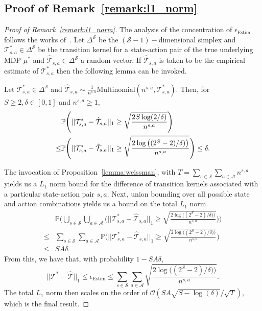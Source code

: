 \subsection{Proof of Remark~\ref{remark:l1_norm}}\label{sec:proof_remark}
\begin{proof}[Proof of Remark~\ref{remark:l1_norm}]
    The analysis of the concentration of $\epsilon_{\mathrm{Estim}}$ follows the works of~\citep{auer2008near, qian2020concentration}. Let $\Delta^{\mathcal{S}}$ be the $(\mathcal{S}-1)-$dimensional simplex and $\mathcal{T}_{s,a}^* \in \Delta^{\mathcal{S}}$ be the transition kernel for a state-action pair of the true underlying MDP $\mu^*$ and $\hat{\mathcal{T}}_{s,a} \in \Delta^{\mathcal{S}}$ a random vector. If $\hat{\mathcal{T}}_{s,a}$ is taken to be the empirical estimate of $\mathcal{T}_{s,a}^*$ then the following lemma can be invoked.
    
    \begin{proposition}\label{lemma:weissman}
        Let $\mathcal{T}_{s,a}^* \in \Delta^{\mathcal{S}}$ and $\hat{\mathcal{T}}_{s,a} \sim \frac{1}{n^{s,a}}\mathrm{Multinomial}(n^{s,a}, \mathcal{T}_{s,a}^*)$. Then, for $S \geq 2, \delta \in [0, 1]$ and $n^{s,a} \geq 1$,
        \begin{align}
            &\mathbb{P}\Bigg(||\mathcal{T}_{s,a}^*-\hat{\mathcal{T}}_{s,a}||_1\geq \sqrt{\frac{2S\log(2/\delta)}{n^{s,a}}}\Bigg) \notag\\
            \leq &\mathbb{P}\Bigg(||\mathcal{T}_{s,a}^*-\hat{\mathcal{T}}_{s,a}||_1 \geq \sqrt{\frac{2\log\big((2^S -2)/\delta)\big)}{n^{s,a}}}\Bigg)\leq \delta.
        \end{align}
    \end{proposition}
    The invocation of Proposition~\ref{lemma:weissman}, with $T=\sum_{s\in\mathcal{S}}\sum_{a\in\mathcal{A}}n^{s,a}$ yields us a $L_1$ norm bound for the difference of transition kernels associated with a particular state-action pair $s, a$. Next, union bounding over all possible state and action combinations yields us a bound on the total $L_1$ norm.
    \begin{align}
        &\mathbb{P}\Bigg(\bigcup_{s\in\mathcal{S}}\bigcup_{a\in\mathcal{A}}\Big(||\mathcal{T}_{s,a}^*-\hat{\mathcal{T}}_{s,a}||_1\geq \sqrt{\frac{2\log\big((2^S -2)/\delta)\big)}{n^{s,a}}}\Big)\Bigg)\\
        \leq &\sum_{s\in\mathcal{S}}\sum_{a\in\mathcal{A}} \mathbb{P}\Bigg(||\mathcal{T}_{s,a}^*-\hat{\mathcal{T}}_{s,a}||_1\geq \sqrt{\frac{2\log\big((2^S -2)/\delta)\big)}{n^{s,a}}}\Bigg)\\
        \leq &SA\delta.
    \end{align}
    From this, we have that, with probability $1-SA\delta$,
    \begin{equation}
        ||\mathcal{T}^*-\hat{\mathcal{T}}||_1 \leq \epsilon_{\mathrm{Estim}} \leq \sum_{s\in\mathcal{S}}\sum_{a\in\mathcal{A}}\sqrt{\frac{2\log\big((2^S -2)/\delta)\big)}{n^{s,a}}}.
    \end{equation}
    The total $L_1$ norm then scales on the order of $\mathcal{O}(SA\sqrt{S-\log(\delta)}/\sqrt{T})$, which is the final result.
\end{proof}

